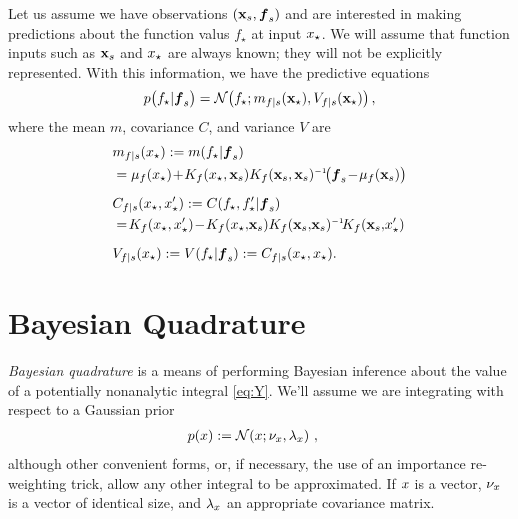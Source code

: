 \documentclass{article}
\renewcommand{\pskinny}[2]{p\big(#1|#2\big)}
\begin{document}
Let us assume we have observations $(\vlfv_s,\vf_s)$ and are interested in making predictions about the function valus $f_\star$ at input $\lfv_\star$. We will assume that function inputs such as $\vlfv_s$ and $\lfv_\star$ are always known; they will not be explicitly represented. With this information, we have the predictive equations
\begin{equation}
 \pskinny{f\st}{\vf_s} = 
\bN{f\st}
{\meancond{f}{\vlfv_\star}{s}}
{\covcond{f}{\vlfv_\star}{s}}\,,
\end{equation}
where the mean $m$, covariance $C$, and variance $V$ are
\begin{align} 
\textstyle
&\meancond{f}{\lfv_\star}{s}
\deq \mean{f_\star}{\vf_s}
\nonumber\\
&= \mu_{f}(\lfv_\star)\!+\!
K_{f}(\lfv_\star,\vlfv_s)
K_{f}(\vlfv_s,\vlfv_s)\inv\!
\bigl(\vf_s\!-\!{\mu}_{f}(\vlfv_s)\bigr)\label{eq:GPMean}
\\[0.2cm]
&C_{f|s}(\lfv_\star, \lfv'_\star)
\deq C(f_\star,f'_\star|\vf_s) 
\nonumber\\
&=\!K_{f}(\lfv_\star,\lfv'_\star)\! - \!
K_{f}(\lfv_\star,\!\vlfv_s)
K_{f}(\vlfv_s,\!\vlfv_s)\inv\!
K_{f}(\vlfv_s,\!\lfv'_\star)%
\\[0.2cm]
&\covcond{f}{\lfv_\star}{s}
\deq {\cov{f_\star}{\vf_s}} 
\deq C_{f|s}(\lfv_\star, \lfv_\star).
\end{align} 

\section{Bayesian Quadrature} \label{sec:bq}


\emph{Bayesian quadrature} \citep{BZHermiteQuadrature,BZMonteCarlo} is a means of performing Bayesian inference about the value of a potentially nonanalytic integral \eqref{eq:Y}.
We'll assume we are integrating with respect to a Gaussian prior
\begin{align}\label{eq:phiprior}
\textstyle
 \po{\lfv} & \deq \N{\lfv}{\nu_{\lfv}}{\lambda_{\lfv}} \,,
\end{align}
although other convenient forms, or, if necessary, the use of an importance re-weighting trick, allow any other integral to be approximated. If $\lfv$ is a vector, $\nu_{\lfv}$ is a  vector of identical size, and $\lambda_{\lfv}$ an appropriate covariance matrix.
\end{document}
